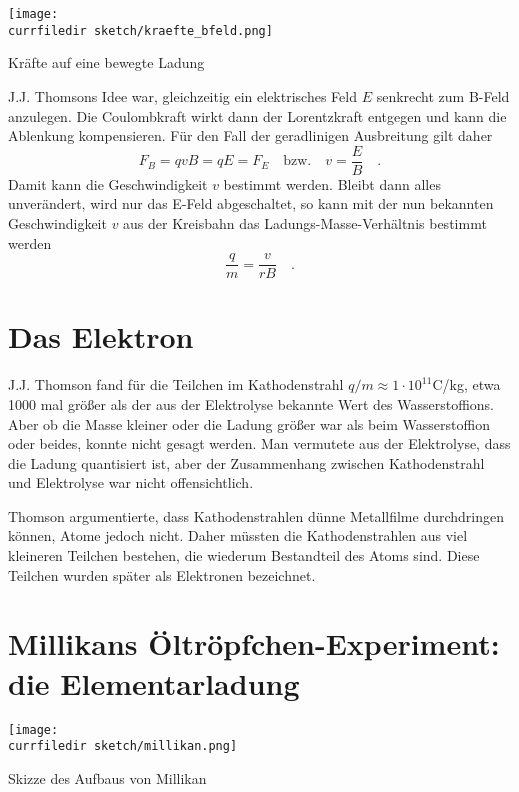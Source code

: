 \begin{marginfigure}
    \texttt{[image: \\currfiledir  sketch/kraefte\_bfeld.png]}
    \caption{Kräfte auf eine bewegte Ladung}
\end{marginfigure}


J.J. Thomsons Idee war, gleichzeitig ein elektrisches Feld $E$ senkrecht zum B-Feld anzulegen. Die Coulombkraft wirkt dann der Lorentzkraft entgegen und kann die Ablenkung kompensieren. Für den Fall der geradlinigen Ausbreitung gilt daher
\begin{equation}
    F_B = q v B = q E = F_E  \quad \text{bzw.} \quad v = \frac{E}{B}  \quad .
\end{equation}
Damit kann die Geschwindigkeit $v$ bestimmt werden. Bleibt dann alles unverändert, wird nur das E-Feld abgeschaltet, so kann mit der nun bekannten Geschwindigkeit $v$ aus der Kreisbahn das Ladungs-Masse-Verhältnis bestimmt werden
\begin{equation}
    \frac{q}{m} = \frac{v}{r B}  \quad .
\end{equation}



\section{Das Elektron}

J.J. Thomson fand für die Teilchen im Kathodenstrahl $q/m \approx 1 \cdot 10^{11}$C/kg, etwa 1000 mal größer als der aus der Elektrolyse bekannte Wert des Wasserstoffions. Aber ob die Masse kleiner oder die Ladung größer war als beim Wasserstoffion oder beides, konnte nicht gesagt werden. Man vermutete aus der Elektrolyse, dass die Ladung quantisiert ist, aber der Zusammenhang zwischen Kathodenstrahl und Elektrolyse war nicht offensichtlich. 

Thomson argumentierte, dass Kathodenstrahlen dünne Metallfilme durchdringen können, Atome jedoch nicht. Daher müssten die Kathodenstrahlen aus viel kleineren Teilchen bestehen, die wiederum Bestandteil des Atoms sind. Diese Teilchen wurden später als Elektronen bezeichnet.

\section{Millikans Öltröpfchen-Experiment: die Elementarladung}

\begin{marginfigure}
    \texttt{[image: \\currfiledir  sketch/millikan.png]}
    \caption{Skizze des Aufbaus von Millikan}
\end{marginfigure}



